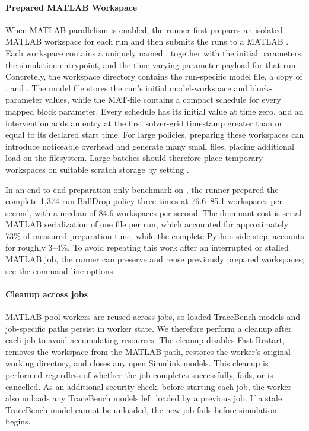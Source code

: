 \documentclass[11pt]{article}
\begin{document}
\paragraph{Prepared MATLAB Workspace}
When MATLAB parallelism is enabled, the runner first prepares an isolated MATLAB workspace for each run and then submits the runs to a MATLAB .
Each workspace contains a uniquely named , together with the initial parameters, the simulation entrypoint, and the time-varying parameter payload for that run. 
Concretely, the workspace directory contains the run-specific model file, a copy of , and .
The model file stores the run's initial model-workspace and block-parameter values, while the MAT-file contains a compact schedule for every mapped block parameter.
Every schedule has its initial value at time zero, and an intervention adds an entry at the first solver-grid timestamp greater than or equal to its declared start time.
For large policies, preparing these workspaces can introduce noticeable overhead and generate many small files, placing additional load on the filesystem.
Large batches should therefore place temporary workspaces on suitable scratch storage by setting . 

In an end-to-end preparation-only benchmark on , the runner prepared the complete 1,374-run BallDrop policy three times at 76.6--85.1 workspaces per second, with a median of 84.6 workspaces per second.
The dominant cost is serial MATLAB serialization of one  file per run, which accounted for approximately 73\% of measured preparation time, while the complete Python-side  step, accounts for roughly 3--4\%.
To avoid repeating this work after an interrupted or stalled MATLAB job, the runner can preserve and reuse previously prepared workspaces; see \hyperref[sec:simulate-cli-options]{the command-line options}.

\paragraph{Cleanup across jobs}
MATLAB pool workers are reused across jobs, so loaded TraceBench models and job-specific paths persist in worker state.
We therefore perform a cleanup after each job to avoid accumulating resources.
The cleanup disables Fast Restart, removes the workspace from the MATLAB path, restores the worker's original working directory, and closes any open Simulink models.
This cleanup is performed regardless of whether the job completes successfully, fails, or is cancelled.
As an additional security check, before starting each job, the worker also unloads any TraceBench models left loaded by a previous job.
If a stale TraceBench model cannot be unloaded, the new job fails before simulation begins.
\end{document}
